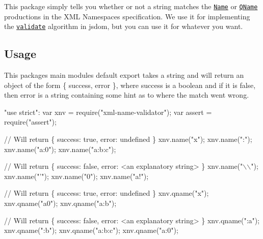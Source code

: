 This package simply tells you whether or not a string matches the \href{http://www.w3.org/TR/xml/#NT-Name}{\tt {\ttfamily Name}} or \href{http://www.w3.org/TR/xml-names/#NT-QName}{\tt {\ttfamily Q\+Name}} productions in the X\+ML Namespaces specification. We use it for implementing the \href{https://dom.spec.whatwg.org/#validate}{\tt validate} algorithm in jsdom, but you can use it for whatever you want.

\subsection*{Usage}

This package\textquotesingle{}s main module\textquotesingle{}s default export takes a string and will return an object of the form {\ttfamily \{ success, error \}}, where {\ttfamily success} is a boolean and if it is {\ttfamily false}, then {\ttfamily error} is a string containing some hint as to where the match went wrong.


\begin{DoxyCode}
"use strict":
var xnv = require("xml-name-validator");
var assert = require("assert");

// Will return \{ success: true, error: undefined \}
xnv.name("x");
xnv.name(":");
xnv.name("a:0");
xnv.name("a:b:c");

// Will return \{ success: false, error: <an explanatory string> \}
xnv.name("\(\backslash\)\(\backslash\)");
xnv.name("'");
xnv.name("0");
xnv.name("a!");

// Will return \{ success: true, error: undefined \}
xnv.qname("x");
xnv.qname("a0");
xnv.qname("a:b");

// Will return \{ success: false, error: <an explanatory string> \}
xnv.qname(":a");
xnv.qname(":b");
xnv.qname("a:b:c");
xnv.qname("a:0");
\end{DoxyCode}
 